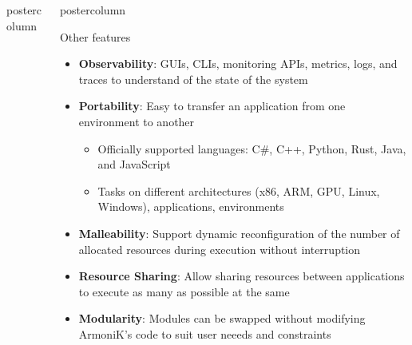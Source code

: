 \begin{frame}[fragile]
\begin{columns}[T]
\begin{column}{.49\textwidth}
\begin{beamercolorbox}[center,wd=\textwidth]{postercolumn}
\begin{minipage}[T]{.96\textwidth}
        \end{minipage}
      \end{beamercolorbox}
    \end{column}
    \begin{column}{.49\textwidth}
      \begin{beamercolorbox}[center,wd=\textwidth]{postercolumn}
        \begin{minipage}[T]{.96\textwidth}
            \begin{block}{Other features}
                \begin{itemize}
                \item \textbf{Observability}: GUIs, CLIs, monitoring APIs, metrics, logs, and traces to understand of the state of the system
                \item \textbf{Portability}: Easy to transfer an application from one environment to another
                \begin{itemize}
                    \item Officially supported languages: C\#, C++, Python, Rust, Java, and JavaScript
                    \item Tasks on different architectures (x86, ARM, GPU, Linux, Windows), applications, environments
                \end{itemize}
                \item \textbf{Malleability}: Support dynamic reconfiguration of the number of allocated resources during execution without interruption
                \item \textbf{Resource Sharing}: Allow sharing resources between applications to execute as many as possible at the same
                \item \textbf{Modularity}: Modules can be swapped without modifying ArmoniK's code to suit user neeeds and constraints
                \end{itemize}
            \end{block}
        \end{minipage}
      \end{beamercolorbox}
    \end{column}
  \end{columns}
  \vfill



\end{frame}
